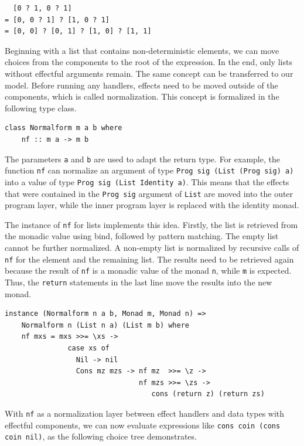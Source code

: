 \documentclass[a4paper, 11pt, fleqn, twoside]{scrreprt}
\newcommand{\hinl}[1]{\texttt{#1}}
\begin{document}
\begin{verbatim}
  [0 ? 1, 0 ? 1]
= [0, 0 ? 1] ? [1, 0 ? 1]
= [0, 0] ? [0, 1] ? [1, 0] ? [1, 1]
\end{verbatim}

Beginning with a list that contains non-deterministic elements, we can move choices from the components to the root of the expression.
In the end, only lists without effectful arguments remain.
The same concept can be transferred to our model.
Before running any handlers, effects need to be moved outside of the components, which is called normalization.
This concept is formalized in the following type class.

\begin{verbatim}
class Normalform m a b where
    nf :: m a -> m b
\end{verbatim}

The parameters \hinl{a} and \hinl{b} are used to adapt the return type.
For example, the function \hinl{nf} can normalize an argument of type \hinl{Prog sig (List (Prog sig) a)} into a value of type \hinl{Prog sig (List Identity a)}.
This means that the effects that were contained in the \hinl{Prog sig} argument of \hinl{List} are moved into the outer program layer, while the inner program layer is replaced with the identity monad.

The instance of \hinl{nf} for lists implements this idea.
Firstly, the list is retrieved from the monadic value using bind, followed by pattern matching.
The empty list cannot be further normalized.
A non-empty list is normalized by recursive calls of \hinl{nf} for the element and the remaining list.
The results need to be retrieved again because the result of \hinl{nf} is a monadic value of the monad \hinl{n}, while \hinl{m} is expected.
Thus, the \hinl{return} statements in the last line move the results into the new monad.
\begin{verbatim}
instance (Normalform n a b, Monad m, Monad n) =>
    Normalform n (List n a) (List m b) where
    nf mxs = mxs >>= \xs ->
               case xs of
                 Nil -> nil
                 Cons mz mzs -> nf mz  >>= \z ->
                                nf mzs >>= \zs ->
                                   cons (return z) (return zs)
\end{verbatim}

With \hinl{nf} as a normalization layer between effect handlers and data types with effectful components, we can now evaluate expressions like \hinl{cons coin (cons coin nil)}, as the following choice tree demonstrates.
\end{document}
